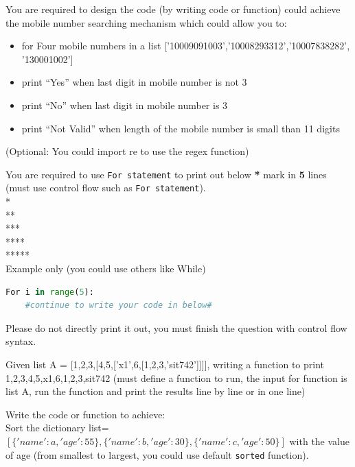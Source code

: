 \documentclass[a4paper]{article}
\begin{document}
    \begin{answer}[Question 1.3]
    You are required to design the code (by writing code or function) could achieve the mobile number searching mechanism which could allow you to:
    \begin{itemize}
        \item for Four mobile numbers in a list ['10009091003','10008293312','10007838282', '130001002']
        \item print “Yes” when last digit in mobile number is not 3
        \item print “No” when last digit in mobile number is 3
        \item print “Not Valid” when length of the mobile number is small than 11 digits
    \end{itemize}
    (Optional: You could import re to use the regex function)
    \end{answer}

    \begin{answer}[Question 1.4]
    You are required to use \texttt{For statement} to
    print out below \textbf{*} mark in \textbf{5} lines
    (must use control flow such as \texttt{For statement}). \\

    * \\
    ** \\
    *** \\
    **** \\
    ***** \\

    Example only (you could use others like While)
    \begin{lstlisting}[language=Python]
For i in range(5):
    #continue to write your code in below#
    \end{lstlisting}
    Please do not directly print it out, you must finish the question with control flow syntax.
    \end{answer}

    \begin{answer}[Question 1.5]
    Given list A = [1,2,3,[4,5,['x1',6,[1,2,3,'sit742']]]],
    writing a function to print 1,2,3,4,5,x1,6,1,2,3,sit742 (must define a function to run, the input for function is list A, run the function and print the results line by line or in one line)
    \end{answer}


    \begin{answer}[Question 1.6]
    Write the code or function to achieve: \\
    Sort the dictionary list=$[\{'name':a,'age':55\},\{'name':b,'age':30\},\{'name':c,'age':50\}]$ with the value of age (from smallest to largest, you could use default \texttt{sorted} function).
    \end{answer}
\end{document}
